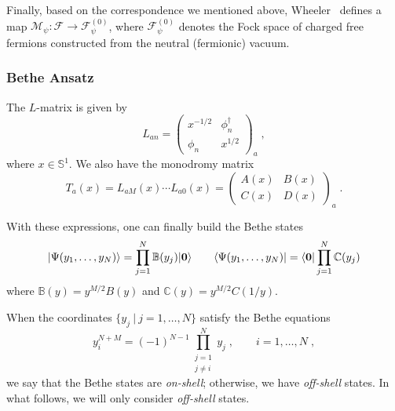 \documentclass[a4paper,11pt]{amsart}
\begin{document}
Finally, based on the correspondence we mentioned above,
Wheeler~\cite{Wheeler:2010vmq} defines a map \(\mathcal{M}_\psi:
\mathcal{F} \to \mathcal{F}^{(0)}_\psi\), where
\(\mathcal{F}^{(0)}_\psi\) denotes the Fock space of charged free
fermions constructed from the neutral (fermionic) vacuum.


\subsubsection{Bethe Ansatz}
The \(L\)-matrix is given by 
\begin{equation}
  L_{an} = 
\begin{pmatrix}
x^{ - 1/2} & \phi_n^\dagger \\ \phi_n & x^{1/2}
\end{pmatrix}_a\; , 
\end{equation}
where \(x \in \mathbb{S}^1\). We also have the monodromy matrix
\begin{equation}
  T_a(x) = L_{aM}(x) \cdots L_{a0}(x) = 
\begin{pmatrix}
A(x) & B(x) \\ C(x) & D(x)
\end{pmatrix}_a\; .
\end{equation}

With these expressions, one can finally build the Bethe states
\begin{equation}
  \lvert\Psi(y_1, \dots, y_N)\rangle = \prod_{j=1}^N \mathbb{B}(y_j) \lvert\bm{0}\rangle \qquad 
  \langle\Psi(y_1, \dots, y_N)\rvert = \langle\bm{0}\rvert\prod_{j=1}^N \mathbb{C}(y_j) 
\end{equation}
where \(\mathbb{B}(y) = y^{M/2} B(y)\) and \(\mathbb{C}(y) = y^{M/2} C(1/y)\).

When the coordinates \(\{ y_j \ | \ j =1, \dots , N\}\) satisfy the Bethe equations
\begin{equation}
\label{eq:bethe_eq}
  y^{N + M}_i = (-1)^{N-1} \prod_{\substack{j = 1 \\ j \neq i}}^N y_j\; , \qquad i = 1, \dots, N\; , 
\end{equation}
we say that the Bethe states are \emph{on-shell}; otherwise, we have
\emph{off-shell} states. In what follows, we will only consider
\emph{off-shell} states.

\end{document}
